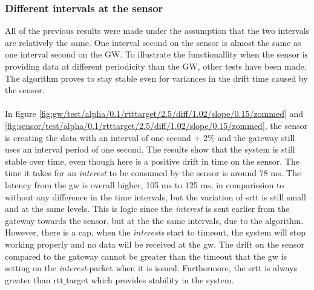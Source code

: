 \subsubsection{Different intervals at the sensor}
All of the previous results were made under the assumption that the two intervals are relatively the same. One interval second on the sensor is almost the same as one interval second on the GW. To illustrate the functionallity when the sensor is providing data at different periodicity than the GW, other tests have been made. The algorithm proves to stay stable even for variances in the drift time caused by the sensor. \\\\
In figure \ref{fig:gw/test/alpha/0.1/rtttarget/2.5/diff/1.02/slope/0.15/zommed} and \ref{fig:sensor/test/alpha/0.1/rtttarget/2.5/diff/1.02/slope/0.15/zommed}, the sensor is creating the data with an interval of one second + 2$\%$ and the gateway still uses an interval period of one second. The results show that the system is still stable over time, even though here is a positive drift in time on the sensor. The time it takes for an \textit{interest} to be consumed by the sensor is around 78 ms. The latency from the gw is overall higher, 105 ms to 125 ms, in comparission to without any difference in the time intervals, but the variation of srtt is still small and at the same levels. This is logic since the \textit{interest} is sent earlier from the gateway towards the sensor, but at the the same intervals, due to the algorithm. However, there is a cap, when the \textit{interests} start to timeout, the system will stop working properly and no data will be received at the gw. The drift on the sensor compared to the gateway cannot be greater than the timeout that the gw is setting on the \textit{interest}-packet when it is issued. Furthermore, the srtt is always greater than rtt$\_$target which provides stability in the system.\\\\
